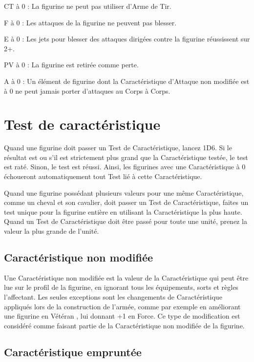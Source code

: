 \noindent CT à 0 : La figurine ne peut pas utiliser d'Arme de Tir.

\noindent F à 0 : Les attaques de la figurine ne peuvent pas blesser.

\noindent E à 0 : Les jets pour blesser des attaques dirigées contre la figurine réussissent sur 2+.

\noindent PV à 0 : La figurine est retirée comme perte.

\noindent A à 0 : Un élément de figurine dont la Caractéristique d'Attaque non modifiée est à 0 ne peut jamais porter d'attaques au Corps à Corps.

\section{Test de caractéristique}

Quand une figurine doit passer un Test de Caractéristique, lancez 1D6. Si le résultat est  ou s'il est strictement plus grand que la Caractéristique testée, le test est raté. Sinon, le test est réussi. Ainsi, les figurines avec une Caractéristique à 0 échoueront automatiquement tout Test lié à cette Caractéristique.

Quand une figurine possédant plusieurs valeurs pour une même Caractéristique, comme un cheval et son cavalier, doit passer un Test de Caractéristique, faites un test unique pour la figurine entière en utilisant la Caractéristique la plus haute. Quand un Test de Caractéristique doit être passé pour toute une unité, prenez la valeur la plus grande de l'unité.

\subsection{Caractéristique non modifiée}

Une Caractéristique non modifiée est la valeur de la Caractéristique qui peut être lue sur le profil de la figurine, en ignorant tous les équipements, sorts et règles l'affectant. Les seules exceptions sont les changements de Caractéristique appliqués lors de la construction de l'armée, comme par exemple en améliorant une figurine en \og Vétéran \fg{}, lui donnant +1 en Force. Ce type de modification est considéré comme faisant partie de la Caractéristique non modifiée de la figurine.

\subsection{Caractéristique empruntée}

